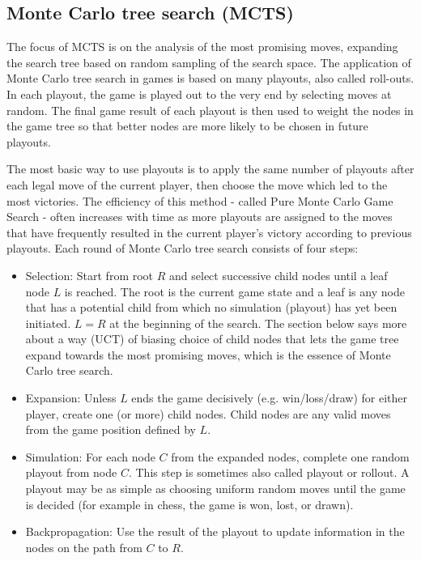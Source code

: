 \documentclass{article}
\begin{document}
\subsection{Monte Carlo tree search (MCTS)}

The focus of MCTS is on the analysis of the most promising moves, expanding the search tree based on random sampling of the search space. The application of Monte Carlo tree search in games is based on many playouts, also called roll-outs. In each playout, the game is played out to the very end by selecting moves at random. The final game result of each playout is then used to weight the nodes in the game tree so that better nodes are more likely to be chosen in future playouts.

The most basic way to use playouts is to apply the same number of playouts after each legal move of the current player, then choose the move which led to the most victories. The efficiency of this method - called Pure Monte Carlo Game Search - often increases with time as more playouts are assigned to the moves that have frequently resulted in the current player's victory according to previous playouts. Each round of Monte Carlo tree search consists of four steps:

\begin{itemize}
    \item Selection: Start from root \(R\) and select successive child nodes until a leaf node \(L\) is reached. The root is the current game state and a leaf is any node that has a potential child from which no simulation (playout) has yet been initiated. \(L = R\) at the beginning of the search. The section below says more about a way (UCT) of biasing choice of child nodes that lets the game tree expand towards the most promising moves, which is the essence of Monte Carlo tree search.
    \item Expansion: Unless \(L\) ends the game decisively (e.g. win/loss/draw) for either player, create one (or more) child nodes. Child nodes are any valid moves from the game position defined by \(L\).
    \item Simulation: For each node \(C\) from the expanded nodes, complete one random playout from node \(C\). This step is sometimes also called playout or rollout. A playout may be as simple as choosing uniform random moves until the game is decided (for example in chess, the game is won, lost, or drawn).
    \item Backpropagation: Use the result of the playout to update information in the nodes on the path from \(C\) to \(R\).
\end{itemize}
\end{document}
